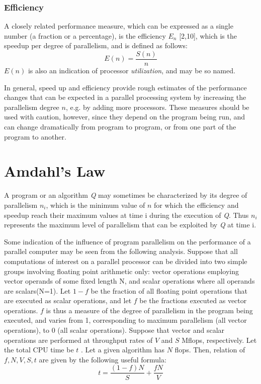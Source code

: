 \subsubsection{Efficiency}

A closely related performance measure, which can be expressed as a single number (a fraction or a percentage), is the efficiency $E_{n}$ [2,10], which is the
speedup per degree of parallelism, and is defined as follows: 
\begin{equation}
E(n) = \frac{S(n)}{n}
\end{equation}
$E(n)$ is also an indication of processor {\em utilization}, and may be so named.\par
\hspace{1in}  In general, speed up and efficiency provide rough estimates of the performance changes that can be expected in a parallel processing system by
increasing the parallelism degree $n$, e.g. by adding more processors. These measures should be used with caution, however, since they depend on the program
being run, and can change dramatically from program to program, or from one part of the program to another. 

\section{Amdahl's Law}
A program or an algorithm {\em Q} may sometimes be characterized by its degree of parallelism $n_{i}$, which is the minimum value of $n$ for which the
efficiency and speedup reach their maximum values at time i during the execution of {\em Q}. Thus $n_{i}$ represents the maximum level of parallelism that
can be exploited by {\em Q} at time i.\par
\hspace{1in}Some indication of the influence of program parallelism on the performance of a parallel computer may be seen from the following analysis.
Suppose that all computations of interest on a parallel processor can be divided into two simple groups involving floating point arithmetic only: vector
operations employing vector operands of some fixed length N, and scalar operations where all operands are scalars(N=1). Let $1-f$ be the fraction of all
floating
point operations that are executed as scalar operations, and let $f$ be the fractions executed as vector operations. $f$ is thus a measure of the degree of
parallelism in the program being executed, and varies from 1, corresponding to maximum parallelism (all vector operations), to 0 (all scalar operations).
Suppose that vector and scalar operations are performed at throughput rates of $V$ and  $S$ Mflops, respectively. Let the total CPU time be $t$ . Let a given
algorithm has $N$ flops. Then, relation of $f, N, V, S, t$ are given by the following useful formula:
\begin{equation}
t = \frac{(1-f)N}{S} + \frac{fN}{V}
\end{equation}

